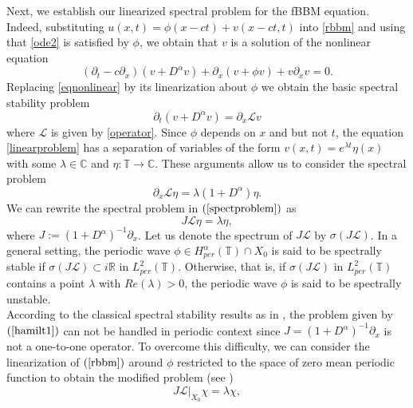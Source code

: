 \documentclass[12pt,reqno]{amsart}
\newcommand{\2}{L^2_{per}(0, T)}
\numberwithin{equation}{section}
\numberwithin{figure}{section}
\begin{document}
Next, we establish our linearized spectral problem for the fBBM equation. Indeed, substituting $u(x,t)= \phi(x-ct)+v(x-ct, t)$ into \eqref{rbbm} and using that \eqref{ode2} is satisfied by $\phi$, we obtain that $v$ is a solution of the nonlinear equation
	\begin{equation}\label{eqnonlinear}
	(\partial_t- c\partial_x)(v + D^{\alpha}v) + \partial_x(v+ \phi v) + v \partial_x v=0.
	\end{equation}
Replacing \eqref{eqnonlinear} by its linearization about $\phi$ we obtain the basic spectral stability problem
	\begin{equation}\label{linearproblem}
	\partial_t(v + D^{\alpha}v) = \partial_x \mathcal{L}v
	\end{equation}
where $\mathcal{L}$ is given by \eqref{operator}. Since $\phi$ depends on $x$ and but not $t$, the equation \eqref{linearproblem} has a separation of variables of the form $v(x,t)= e^{\lambda t}\eta(x)$ with some $\lambda \in \mathbb{C}$ and $\eta: \mathbb{T} \rightarrow \mathbb{C}$. These arguments allow us to consider the spectral problem
	\begin{equation}\label{spectproblem}
	\partial_x \mathcal{L}\eta = \lambda (1 + D^{\alpha})\eta.
	\end{equation}
\indent We can rewrite the spectral problem in $(\ref{spectproblem})$ as
\begin{equation}
	J \mathcal{L}\eta= \lambda \eta,
	\label{hamilt1}\end{equation}
where $J:=(1+D^{\alpha})^{-1}\partial_x$. Let us denote the spectrum of $J\mathcal{L}$ by $\sigma(J\mathcal{L})$. In a general setting, the periodic wave $\phi\in H^{\alpha}_{per}(\mathbb{T})\cap X_0$ is said to be spectrally stable if $\sigma(J\mathcal{L}) \subset i\mathbb{R}$ in  $L^2_{per}(\mathbb{T})$. Otherwise, that is, if $\sigma(J\mathcal{L})$ in $L^2_{per}(\mathbb{T})$ contains a point $\lambda$ with $Re(\lambda)>0$, the periodic wave $\phi$ is said to be spectrally unstable.\\
 \indent According to the classical spectral stability results as in \cite{grillakis1}, the problem given by $(\ref{hamilt1})$ can not be handled in periodic context since $J= (1+D^{\alpha})^{-1}\partial_x$ is not a one-to-one operator. To overcome this difficulty, we can consider the linearization of $(\ref{rbbm})$ around $\phi$ restricted to the space of zero mean periodic function to obtain the modified problem (see \cite{DK})
	\begin{equation}\label{hamilt2}
	J\mathcal{L}|_{X_0}\chi = \lambda \chi,
	\end{equation}
\end{document}
